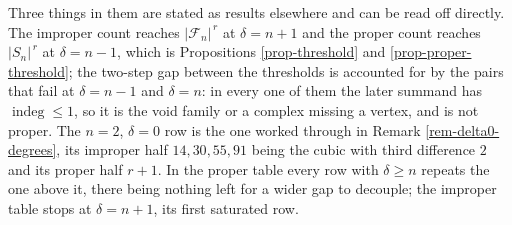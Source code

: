 \documentclass[11pt, a4paper, abstract=yes]{scrartcl}
\theoremstyle{definition}
\theoremstyle{remark}
\theoremstyle{plain}
\newcommand{\indeg}{\operatorname{indeg}}
\begin{document}
Three things in them are stated as results elsewhere and can be read off directly. The improper
count reaches \(\lvert\mathcal F_n\rvert^{\,r}\) at \(\delta=n+1\) and the proper count reaches
\(\lvert S_n\rvert^{\,r}\) at \(\delta=n-1\), which is Propositions \ref{prop-threshold} and
\ref{prop-proper-threshold}; the two-step gap between the thresholds is accounted for by the pairs
that fail at \(\delta=n-1\) and \(\delta=n\): in every one of them the later summand has
\(\indeg\le1\), so it is the void family or a complex missing a vertex, and is not proper. The \(n=2\), \(\delta=0\) row is the one worked through in
Remark \ref{rem-delta0-degrees}, its improper half \(14,30,55,91\) being the cubic with third
difference \(2\) and its proper half \(r+1\). In the proper table every row with \(\delta\ge n\)
repeats the one above it, there being nothing left for a wider gap to decouple; the improper table
stops at \(\delta=n+1\), its first saturated row.
\end{document}
